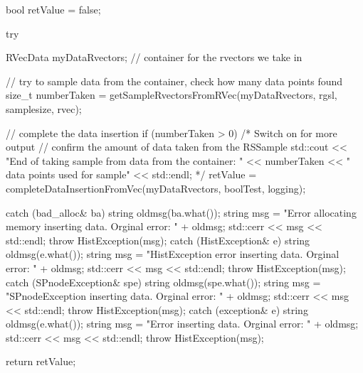 \begin{DoxyCode}
{
    bool retValue = false;

    try {

        RVecData myDataRvectors; // container for the rvectors we take in

        // try to sample data from the container, check how many data points
       found
        size_t numberTaken = getSampleRvectorsFromRVec(myDataRvectors,
                                rgsl, samplesize, rvec);

        // complete the data insertion
        if (numberTaken > 0) {
            /*  Switch on for more output
            // confirm the amount of data taken from the RSSample
            std::cout << "End of taking sample from data from the container: "
            << numberTaken << " data points used for sample" << std::endl;
            */
            retValue = completeDataInsertionFromVec(myDataRvectors,
                                                    boolTest, logging);
        }
    }
    catch (bad_alloc& ba) {
        string oldmsg(ba.what());
        string msg = "Error allocating memory inserting data.  Orginal error: "
                                            + oldmsg;
        std::cerr << msg << std::endl;
        throw HistException(msg);
    }
    catch (HistException& e) {
        string oldmsg(e.what());
        string msg = "HistException error inserting data.  Orginal error: "
                                    + oldmsg;
        std::cerr << msg << std::endl;
        throw HistException(msg);
    }
    catch (SPnodeException& spe) {
        string oldmsg(spe.what());
        string msg = "SPnodeException inserting data.  Orginal error: " + 
      oldmsg;
        std::cerr << msg << std::endl;
        throw HistException(msg);
    }
    catch (exception& e) {
        string oldmsg(e.what());
        string msg = "Error inserting data.  Orginal error: " + oldmsg;
        std::cerr << msg << std::endl;
        throw HistException(msg);
    }


    return retValue;

}
\end{DoxyCode}
